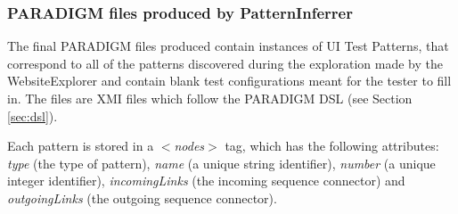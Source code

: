 \begin{table}[!htb]
\caption{Execution trace example from which a Login pattern can be inferred.}
\label{tab:fullpattern}
\end{table}

\subsubsection{PARADIGM files produced by PatternInferrer}
The final PARADIGM files produced contain instances of UI Test Patterns, that correspond to all of the patterns discovered during the exploration made by the WebsiteExplorer and contain blank test configurations meant for the tester to fill in. The files are XMI files which follow the PARADIGM DSL (see Section \ref{sec:dsl}).

Each pattern is stored in a $<$\textit{nodes}$>$ tag, which has the following attributes: \textit{type} (the type of pattern), \textit{name} (a unique string identifier), \textit{number} (a unique integer identifier), \textit{incomingLinks} (the incoming sequence connector) and \textit{outgoingLinks} (the outgoing sequence connector).

